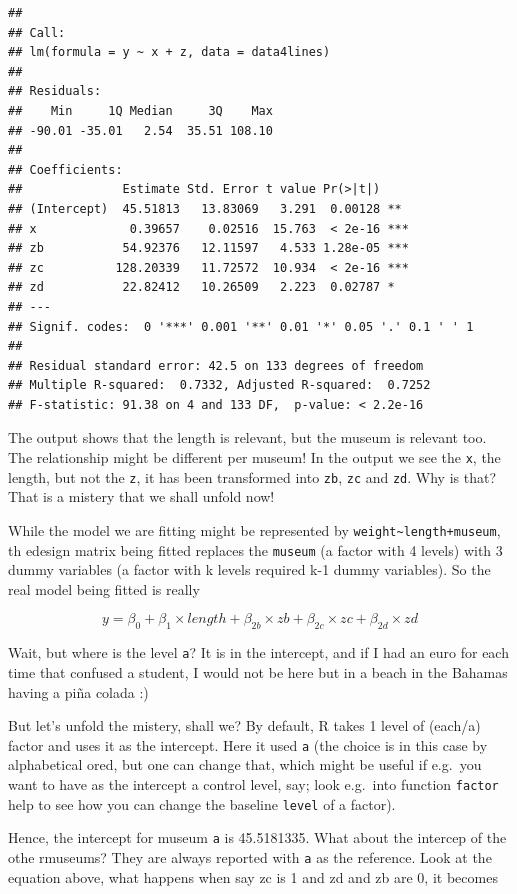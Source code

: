 \documentclass[
]{book}
\begin{document}
\begin{verbatim}
## 
## Call:
## lm(formula = y ~ x + z, data = data4lines)
## 
## Residuals:
##    Min     1Q Median     3Q    Max 
## -90.01 -35.01   2.54  35.51 108.10 
## 
## Coefficients:
##              Estimate Std. Error t value Pr(>|t|)    
## (Intercept)  45.51813   13.83069   3.291  0.00128 ** 
## x             0.39657    0.02516  15.763  < 2e-16 ***
## zb           54.92376   12.11597   4.533 1.28e-05 ***
## zc          128.20339   11.72572  10.934  < 2e-16 ***
## zd           22.82412   10.26509   2.223  0.02787 *  
## ---
## Signif. codes:  0 '***' 0.001 '**' 0.01 '*' 0.05 '.' 0.1 ' ' 1
## 
## Residual standard error: 42.5 on 133 degrees of freedom
## Multiple R-squared:  0.7332, Adjusted R-squared:  0.7252 
## F-statistic: 91.38 on 4 and 133 DF,  p-value: < 2.2e-16
\end{verbatim}

The output shows that the length is relevant, but the museum is relevant too. The relationship might be different per museum! In the output we see the \texttt{x}, the length, but not the \texttt{z}, it has been transformed into \texttt{zb}, \texttt{zc} and \texttt{zd}. Why is that? That is a mistery that we shall unfold now!

While the model we are fitting might be represented by \texttt{weight\textasciitilde{}length+museum}, th edesign matrix being fitted replaces the \texttt{museum} (a factor with 4 levels) with 3 dummy variables (a factor with k levels required k-1 dummy variables). So the real model being fitted is really

\[y=\beta_0+\beta_1 \times length + \beta_{2b} \times zb + \beta_{2c} \times zc + \beta_{2d} \times zd\]

Wait, but where is the level \texttt{a}? It is in the intercept, and if I had an euro for each time that confused a student, I would not be here but in a beach in the Bahamas having a piña colada :)

But let's unfold the mistery, shall we? By default, R takes 1 level of (each/a) factor and uses it as the intercept. Here it used \texttt{a} (the choice is in this case by alphabetical ored, but one can change that, which might be useful if e.g.~you want to have as the intercept a control level, say; look e.g.~into function \texttt{factor} help to see how you can change the baseline \texttt{level} of a factor).

Hence, the intercept for museum \texttt{a} is 45.5181335. What about the intercep of the othe rmuseums? They are always reported with \texttt{a} as the reference. Look at the equation above, what happens when say zc is 1 and zd and zb are 0, it becomes
\end{document}
